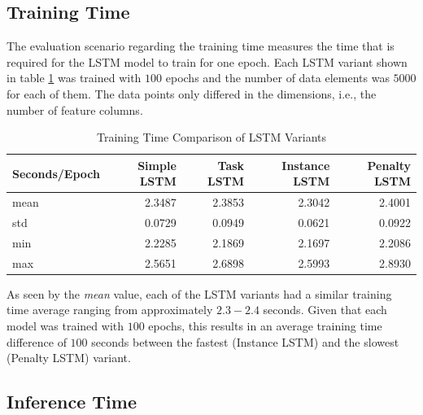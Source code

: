   \subsection{Training Time}
  \label{sec:training-time-evaluation-scenarios}

    The evaluation scenario regarding the training time measures the time that is required for the LSTM model to train for one epoch.
    Each LSTM variant shown in table \ref{tab:training-time-comparison-of-lstm-variants} was trained with $100$ epochs and the number of data elements was $5000$ for each of them. The data points only differed in the dimensions, i.e., the number of feature columns.


    \begin{table}
      \centering

      \caption{Training Time Comparison of LSTM Variants}
      \label{tab:training-time-comparison-of-lstm-variants}

      \begin{tabular}{|l|rrrr|}
        \toprule
        {Seconds/Epoch} &  Simple LSTM &  Task LSTM &  Instance LSTM &  Penalty LSTM \\
        \midrule
        mean    &         2.3487 &      2.3853 &          2.3042 &             2.4001 \\
        std     &         0.0729 &      0.0949 &          0.0621 &             0.0922 \\
        min     &         2.2285 &      2.1869 &          2.1697 &             2.2086 \\
        max     &         2.5651 &      2.6898 &          2.5993 &             2.8930 \\
        \bottomrule
      \end{tabular}
    \end{table}
    As seen by the \emph{mean} value, each of the LSTM variants had a similar training time average ranging from approximately $2.3-2.4$ seconds.
    Given that each model was trained with $100$ epochs, this results in an average training time difference of $100$ seconds between the fastest (Instance LSTM) and the slowest (Penalty LSTM) variant.

  \subsection{Inference Time}
  \label{sec:inference-time-evaluation-scenarios}

